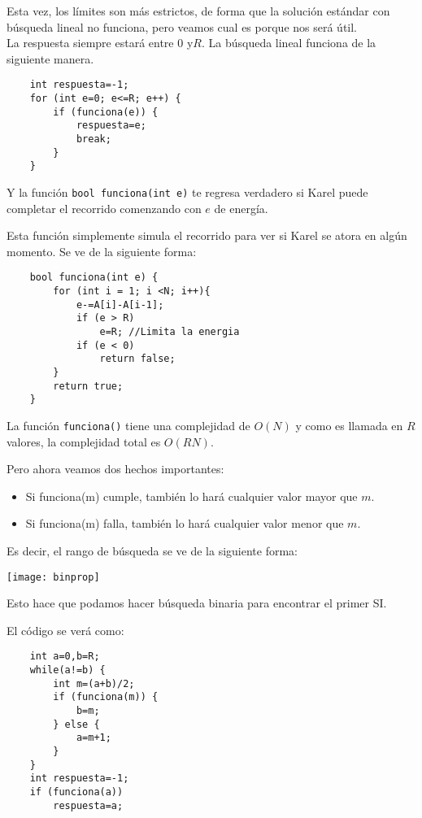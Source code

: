 Esta vez, los límites son más estrictos, de forma que la solución estándar con búsqueda lineal no funciona, pero veamos cual es porque nos será útil.
\\

La respuesta siempre estará entre \(0\)  y\(R\). La búsqueda lineal funciona de la siguiente manera.
\begin{lstlisting}
	int respuesta=-1;
	for (int e=0; e<=R; e++) {
		if (funciona(e)) {
			respuesta=e;
			break;
		}
	}
\end{lstlisting}

Y la función \verb|bool funciona(int e)| te regresa verdadero si Karel puede completar el recorrido comenzando con \(e\) de energía.

Esta función simplemente simula el recorrido para ver si Karel se atora en algún momento. Se ve de la siguiente forma:

\begin{lstlisting}
	bool funciona(int e) {
		for (int i = 1; i <N; i++){
			e-=A[i]-A[i-1];
			if (e > R) 
				e=R; //Limita la energia
			if (e < 0)
				return false;			
		}
		return true;
	}
\end{lstlisting}

La función \verb|funciona()| tiene una complejidad de \(O(N)\) y como es llamada en \(R\) valores, la complejidad total es \(O(RN)\).

Pero ahora veamos dos hechos importantes:
\begin{itemize}
	\item Si funciona(m) cumple, también lo hará cualquier valor mayor que \(m\).
	\item Si funciona(m) falla, también lo hará cualquier valor menor que \(m\).
\end{itemize}

Es decir, el rango de búsqueda se ve de la siguiente forma:

\begin{center}
	\texttt{[image: binprop]}
\end{center}

Esto hace que podamos hacer búsqueda binaria para encontrar el primer SI.

El código se verá como:

\begin{lstlisting}
	int a=0,b=R;
	while(a!=b) {
		int m=(a+b)/2;
		if (funciona(m)) {
			b=m;
		} else {
			a=m+1;
		}
	}
	int respuesta=-1;
	if (funciona(a))
		respuesta=a;
\end{lstlisting}


